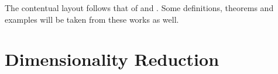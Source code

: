 The contentual layout follows that of \cite{Coifman20065} and \cite{Belkin2003}. Some definitions, theorems and examples will be taken from these works as well.

\section{Dimensionality Reduction}